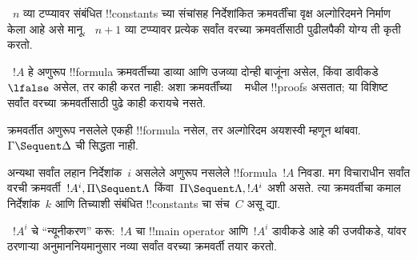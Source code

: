\documentclass[../../../include/open-logic-section]{subfiles}
\begin{document}
~$n$ व्या टप्प्यावर संबंधित !!{constant}s
च्या संचांसह निर्देशांकित क्रमवर्तींचा वृक्ष
अल्गोरिदमने निर्माण केला आहे असे मानू.
~$n+1$ व्या टप्प्यावर प्रत्येक सर्वांत वरच्या
क्रमवर्तीसाठी पुढीलपैकी योग्य ती कृती करतो.

~$!A$ हे अणुरूप !!{formula} क्रमवर्तीच्या डाव्या
आणि उजव्या दोन्ही बाजूंना असेल, किंवा डावीकडे
$\lfalse$ असेल, तर काही करत नाही: अशा क्रमवर्तींच्या
~ मधील !!{proof}s असतात; या विशिष्ट
सर्वांत वरच्या क्रमवर्तीसाठी पुढे काही करायचे नसते.

क्रमवर्तीत अणुरूप नसलेले एकही !!{formula}
नसेल, तर अल्गोरिदम अयशस्वी म्हणून थांबवा.
$\Gamma \Sequent \Delta$ ची सिद्धता नाही.

अन्यथा सर्वांत लहान निर्देशांक~$i$ असलेले
अणुरूप नसलेले !!{formula}~$!A$ निवडा. मग विचाराधीन
सर्वांत वरची क्रमवर्ती~$!A^i, \Pi \Sequent \Lambda$
किंवा~$\Pi \Sequent \Lambda, !A^i$ अशी असते.
त्या क्रमवर्तीचा कमाल निर्देशांक~$k$ आणि
तिच्याशी संबंधित !!{constant}s चा संच~$C$ असू द्या.

~$!A^i$ चे ``न्यूनीकरण'' करू:~$!A$
चा !!{main operator} आणि~$!A^i$ डावीकडे आहे
की उजवीकडे, यांवर ठरणाऱ्या अनुमाननियमानुसार
नव्या सर्वांत वरच्या क्रमवर्ती तयार करतो.
\end{document}
